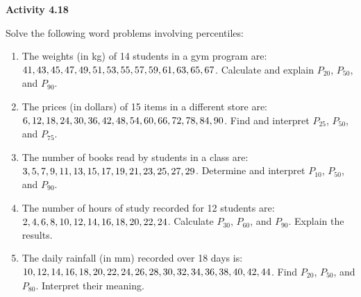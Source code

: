 \vspace{0.3ex}
\noindent\textbf{Activity 4.18}

\vspace{0.2ex}

Solve the following word problems involving percentiles:  

\begin{enumerate}
    \item The weights (in kg) of 14 students in a gym program are: \(41, 43, 45, 47, 49,\\ 51, 53, 55, 57, 59, 61, 63, 65, 67\). Calculate and explain \(P_{20}\), \(P_{50}\), and \(P_{90}\). 
    \item The prices (in dollars) of 15 items in a different store are: \(6, 12, 18, 24, 30,\\ 36, 42, 48, 54, 60, 66, 72, 78, 84, 90\). Find and interpret \(P_{25}\), \(P_{50}\), and \(P_{75}\). 
    \item The number of books read by students in a class are: \(3, 5, 7, 9, 11, 13, 15,\\ 17, 19, 21, 23, 25, 27, 29\). Determine and interpret \(P_{10}\), \(P_{50}\), and \(P_{90}\). 
    \item The number of hours of study recorded for 12 students are: \(2, 4, 6, 8, 10, 12,\\ 14, 16, 18, 20, 22, 24\). Calculate \(P_{30}\), \(P_{60}\), and \(P_{90}\). Explain the results.  
    \item The daily rainfall (in mm) recorded over 18 days is: \(10, 12, 14, 16, 18, 20,\\ 22, 24, 26, 28, 30, 32, 34, 36, 38, 40, 42, 44\). Find \(P_{20}\), \(P_{50}\), and \(P_{80}\). Interpret their meaning.  
\end{enumerate}
